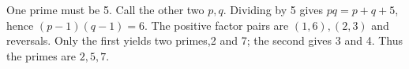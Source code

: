 One prime must be 5. Call the other two $p,q$. Dividing by 5 gives $pq=p+q+5$, hence $(p-1)(q-1)=6$. The positive factor pairs are $(1,6),(2,3)$ and reversals. Only the first yields two primes,2 and 7; the second gives 3 and 4. Thus the primes are $\boxed{2,5,7}$.
